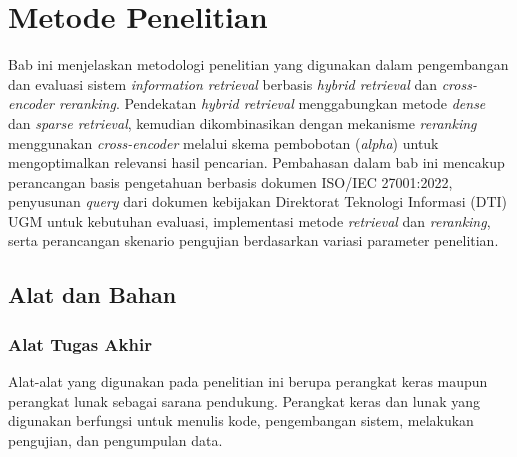 %



\chapter{Metode Penelitian}

Bab ini menjelaskan metodologi penelitian yang digunakan dalam pengembangan dan evaluasi sistem \textit{information retrieval} berbasis \textit{hybrid retrieval} dan \textit{cross-encoder reranking}. Pendekatan \textit{hybrid retrieval} menggabungkan metode \textit{dense} dan \textit{sparse retrieval}, kemudian dikombinasikan dengan mekanisme \textit{reranking} menggunakan \textit{cross-encoder} melalui skema pembobotan (\textit{alpha}) untuk mengoptimalkan relevansi hasil pencarian. Pembahasan dalam bab ini mencakup perancangan basis pengetahuan berbasis dokumen ISO/IEC 27001:2022, penyusunan \textit{query} dari dokumen kebijakan Direktorat Teknologi Informasi (DTI) UGM untuk kebutuhan evaluasi, implementasi metode \textit{retrieval} dan \textit{reranking}, serta perancangan skenario pengujian berdasarkan variasi parameter penelitian.

\section{Alat dan Bahan}

\subsection{Alat Tugas Akhir}

Alat-alat yang digunakan pada penelitian ini berupa perangkat keras maupun perangkat lunak sebagai sarana pendukung. Perangkat keras dan lunak yang digunakan berfungsi untuk menulis kode, pengembangan sistem, melakukan pengujian, dan pengumpulan data.

